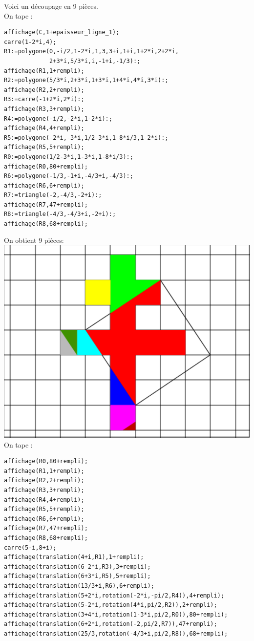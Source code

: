 \documentclass[a4paper,11pt]{book}
\begin{document}
Voici un d\'ecoupage en 9 pi\`eces.\\
On tape :
\begin{verbatim}
affichage(C,1+epaisseur_ligne_1);
carre(1-2*i,4);
R1:=polygone(0,-i/2,1-2*i,1,3,3+i,1+i,1+2*i,2+2*i,
             2+3*i,5/3*i,i,-1+i,-1/3):;
affichage(R1,1+rempli);
R2:=polygone(5/3*i,2+3*i,1+3*i,1+4*i,4*i,3*i):;
affichage(R2,2+rempli);
R3:=carre(-1+2*i,2*i):;
affichage(R3,3+rempli);
R4:=polygone(-i/2,-2*i,1-2*i):;
affichage(R4,4+rempli);
R5:=polygone(-2*i,-3*i,1/2-3*i,1-8*i/3,1-2*i):;
affichage(R5,5+rempli);
R0:=polygone(1/2-3*i,1-3*i,1-8*i/3):;
affichage(R0,80+rempli);
R6:=polygone(-1/3,-1+i,-4/3+i,-4/3):;
affichage(R6,6+rempli);
R7:=triangle(-2,-4/3,-2+i):;
affichage(R7,47+rempli);
R8:=triangle(-4/3,-4/3+i,-2+i):;
affichage(R8,68+rempli);
\end{verbatim}
On obtient 9 pi\`eces:\\
\includegraphics[width=\textwidth]{puzzlecroix11}\\
On tape :
\begin{verbatim}
affichage(R0,80+rempli);
affichage(R1,1+rempli);
affichage(R2,2+rempli);
affichage(R3,3+rempli);
affichage(R4,4+rempli);
affichage(R5,5+rempli);
affichage(R6,6+rempli);
affichage(R7,47+rempli);
affichage(R8,68+rempli);
carre(5-i,8+i);
affichage(translation(4+i,R1),1+rempli);
affichage(translation(6-2*i,R3),3+rempli);
affichage(translation(6+3*i,R5),5+rempli);
affichage(translation(13/3+i,R6),6+rempli);
affichage(translation(5+2*i,rotation(-2*i,-pi/2,R4)),4+rempli);
affichage(translation(5-2*i,rotation(4*i,pi/2,R2)),2+rempli);
affichage(translation(3+4*i,rotation(1-3*i,pi/2,R0)),80+rempli);
affichage(translation(6+2*i,rotation(-2,pi/2,R7)),47+rempli);
affichage(translation(25/3,rotation(-4/3+i,pi/2,R8)),68+rempli);
\end{verbatim}
\end{document}
